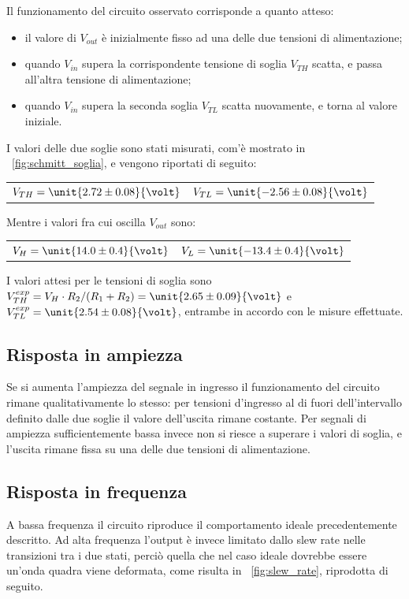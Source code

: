 \documentclass[10pt,a4paper]{article}
\begin{document}
Il funzionamento del circuito osservato corrisponde a quanto atteso:
\begin{itemize}
\item il valore di $V_{out}$ è inizialmente fisso ad una delle due tensioni di alimentazione;
\item quando $V_{in}$ supera la corrispondente tensione di soglia $V_{TH}$ scatta, e passa all'altra tensione di alimentazione;
\item quando $V_{in}$ supera la seconda soglia $V_{TL}$ scatta nuovamente, e torna al valore iniziale.
\end{itemize}

I valori delle due soglie sono stati misurati, com'è mostrato in \figurename{~\ref{fig:schmitt_soglia}}, e vengono riportati di seguito:

\begin{table}[H]
	\centering
	\begin{tabular}{cc}
        $ V_{TH} = \unit{2.72 \pm 0.08}{\volt}$  & $V_{TL} = \unit{-2.56 \pm 0.08}{\volt}$
	\end{tabular}
\end{table}

Mentre i valori fra cui oscilla $V_{out}$ sono:

\begin{table}[H]
	\centering
	\begin{tabular}{cc}
        $ V_{H} = \unit{14.0 \pm 0.4}{\volt}$  & $V_{L} = \unit{-13.4 \pm 0.4}{\volt}$
	\end{tabular}
\end{table}

I valori attesi per le tensioni di soglia sono $V_{TH}^{exp} = V_H \cdot R_2/(R_1+R_2) = \unit{2.65 \pm 0.09}{\volt}$ e $V_{TL}^{exp} = \unit{2.54 \pm 0.08}{\volt}$, entrambe in accordo con le misure effettuate. 
 

\subsection{Risposta in ampiezza} Se si aumenta l'ampiezza del segnale in ingresso il funzionamento del circuito rimane qualitativamente lo stesso: per tensioni d'ingresso al di fuori dell'intervallo definito dalle due soglie il valore dell'uscita rimane costante. Per segnali di ampiezza sufficientemente bassa invece non si riesce a superare i valori di soglia, e l'uscita rimane fissa su una delle due tensioni di alimentazione.

\subsection{Risposta in frequenza} A bassa frequenza il circuito riproduce il comportamento ideale precedentemente descritto. Ad alta frequenza l'output è invece limitato dallo slew rate nelle transizioni tra i due stati, perciò quella che nel caso ideale dovrebbe essere un'onda quadra viene deformata, come risulta in \figurename{~\ref{fig:slew_rate}}, riprodotta di seguito.
\end{document}
